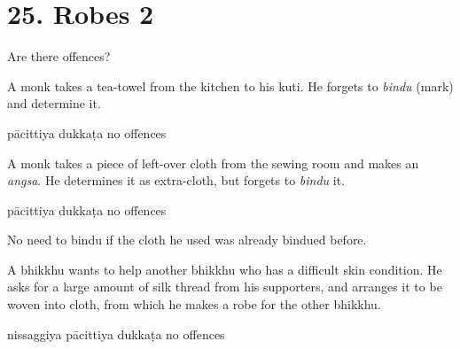 \chapter{25. Robes 2}
\renewcommand*{\theChapterTitle}{25. Robes 2}

\begin{exam}{\autoExamName}

  \begin{problem*}

    Are there offences?

    \begin{parts}

      \item A monk takes a tea-towel from the kitchen to his kuti.
      He forgets to \emph{bindu} (mark) and determine it.

      \bigskip

      \begin{answers}{3}
        \bChoices
         pācittiya\eAns
         dukkaṭa\eAns
         no offences\eAns
        \eChoices
      \end{answers}

      \bigskip

      \item A monk takes a piece of left-over cloth from the sewing room and
      makes an \emph{angsa}. He determines it as extra-cloth, but forgets to \emph{bindu} it.

      \bigskip

      \begin{answers}{3}
        \bChoices
         pācittiya\eAns
         dukkaṭa\eAns
         no offences\eAns
        \eChoices
      \end{answers}

      \begin{solution}
        No need to bindu if the cloth he used was already bindued before.
      \end{solution}

      \bigskip

      \item A bhikkhu wants to help another bhikkhu who has a difficult skin
      condition. He asks for a large amount of silk thread from his supporters,
      and arranges it to be woven into cloth, from which he makes a robe for the
      other bhikkhu.

      \bigskip

      \begin{answers}{3}
        \bChoices
         nissaggiya pācittiya\eAns
         dukkaṭa\eAns
         no offences\eAns
        \eChoices
      \end{answers}


\end{parts}
\end{problem*}
\end{exam}
